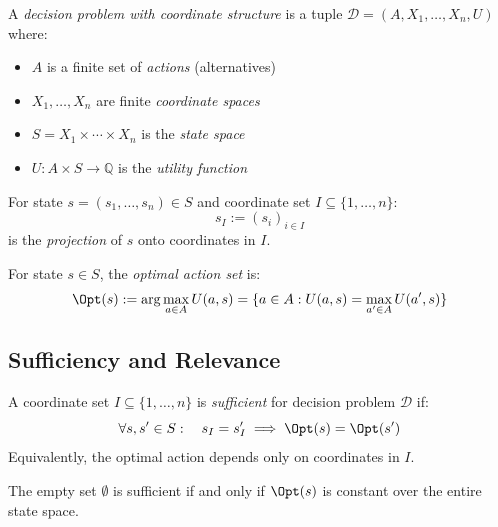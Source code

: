 \begin{definition}\label{def:decision-problem}
A \emph{decision problem with coordinate structure} is a tuple $\mathcal{D} = (A, X_1, \ldots, X_n, U)$ where:
\begin{itemize}
\item $A$ is a finite set of \emph{actions} (alternatives)
\item $X_1, \ldots, X_n$ are finite \emph{coordinate spaces}
\item $S = X_1 \times \cdots \times X_n$ is the \emph{state space}
\item $U : A \times S \to \mathbb{Q}$ is the \emph{utility function}
\end{itemize}
\end{definition}

\begin{definition}[Projection]\label{def:projection}
For state $s = (s_1, \ldots, s_n) \in S$ and coordinate set $I \subseteq \{1, \ldots, n\}$:
\[
s_I := (s_i)_{i \in I}
\]
is the \emph{projection} of $s$ onto coordinates in $I$.
\end{definition}

\begin{definition}\label{def:optimizer}
For state $s \in S$, the \emph{optimal action set} is:
\[
\Opt(s) := \arg\max_{a \in A} U(a, s) = \{a \in A : U(a,s) = \max_{a' \in A} U(a', s)\}
\]
\end{definition}

\subsection{Sufficiency and Relevance}

\begin{definition}\label{def:sufficient}
A coordinate set $I \subseteq \{1, \ldots, n\}$ is \emph{sufficient} for decision problem $\mathcal{D}$ if:
\[
\forall s, s' \in S: \quad s_I = s'_I \implies \Opt(s) = \Opt(s')
\]
Equivalently, the optimal action depends only on coordinates in $I$.
\end{definition}

\begin{proposition}\label{prop:empty-sufficient-constant}
The empty set $\emptyset$ is sufficient if and only if $\Opt(s)$ is constant over the entire state space.
\end{proposition}

